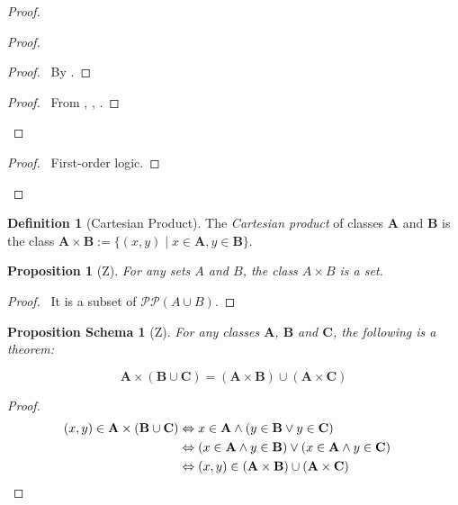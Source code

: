 \documentclass{book}
\let\qed\relax
\newtheorem{prop}[ax]{Proposition}
\newtheorem{props}[ax]{Proposition Schema}
\theoremstyle{definition}
\newtheorem{df}[ax]{Definition}
\begin{document}
\begin{proof}
\pf
{}
\begin{proof}
	\begin{proof}
		\pf\ By .
	\end{proof}
	\begin{proof}
		\pf\ From , , .
	\end{proof}
\end{proof}
\begin{proof}
	\pf\ First-order logic.
\end{proof}
\qed
\end{proof}

\begin{df}[Cartesian Product]
The \emph{Cartesian product} of classes $\mathbf{A}$ and $\mathbf{B}$ is the class $\mathbf{A} \times \mathbf{B} := \{(x,y) \mid x \in \mathbf{A}, y \in \mathbf{B}\}$.
\end{df}

\begin{prop}[Z]
For any sets $A$ and $B$, the class $A \times B$ is a set.
\end{prop}

\begin{proof}
\pf\ It is a subset of $\mathcal{P} \mathcal{P} (A \cup B)$. \qed
\end{proof}

\begin{props}[Z]
For any classes $\mathbf{A}$, $\mathbf{B}$ and $\mathbf{C}$, the following is a theorem:

\[ \mathbf{A} \times (\mathbf{B} \cup \mathbf{C}) = (\mathbf{A} \times \mathbf{B}) \cup (\mathbf{A} \times \mathbf{C}) \]
\end{props}

\begin{proof}
\pf
\begin{align*}
(x,y) \in \mathbf{A} \times (\mathbf{B} \cup \mathbf{C}) & \Leftrightarrow x \in \mathbf{A} \wedge (y \in \mathbf{B} \vee y \in \mathbf{C}) \\
& \Leftrightarrow (x \in \mathbf{A} \wedge y \in \mathbf{B}) \vee (x \in \mathbf{A} \wedge y \in \mathbf{C}) \\
& \Leftrightarrow (x,y) \in (\mathbf{A} \times \mathbf{B}) \cup (\mathbf{A} \times \mathbf{C}) & \qed
\end{align*}
\end{proof}
\end{document}
